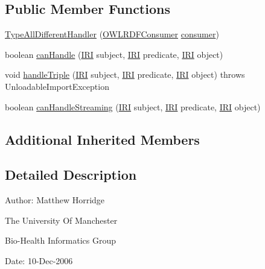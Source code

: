 \subsection*{Public Member Functions}
\begin{DoxyCompactItemize}
\item 
\hyperlink{classorg_1_1coode_1_1owlapi_1_1rdfxml_1_1parser_1_1_type_all_different_handler_aa12a865a3096be12c203fff853d6a3b7}{Type\-All\-Different\-Handler} (\hyperlink{classorg_1_1coode_1_1owlapi_1_1rdfxml_1_1parser_1_1_o_w_l_r_d_f_consumer}{O\-W\-L\-R\-D\-F\-Consumer} \hyperlink{classorg_1_1coode_1_1owlapi_1_1rdfxml_1_1parser_1_1_abstract_triple_handler_a4ccf4d898ff01eb1cadfa04b23d54e9c}{consumer})
\item 
boolean \hyperlink{classorg_1_1coode_1_1owlapi_1_1rdfxml_1_1parser_1_1_type_all_different_handler_a553fddaf13909b537fced98ef8948033}{can\-Handle} (\hyperlink{classorg_1_1semanticweb_1_1owlapi_1_1model_1_1_i_r_i}{I\-R\-I} subject, \hyperlink{classorg_1_1semanticweb_1_1owlapi_1_1model_1_1_i_r_i}{I\-R\-I} predicate, \hyperlink{classorg_1_1semanticweb_1_1owlapi_1_1model_1_1_i_r_i}{I\-R\-I} object)
\item 
void \hyperlink{classorg_1_1coode_1_1owlapi_1_1rdfxml_1_1parser_1_1_type_all_different_handler_afce4e179b45a790d2f9009a8f4208044}{handle\-Triple} (\hyperlink{classorg_1_1semanticweb_1_1owlapi_1_1model_1_1_i_r_i}{I\-R\-I} subject, \hyperlink{classorg_1_1semanticweb_1_1owlapi_1_1model_1_1_i_r_i}{I\-R\-I} predicate, \hyperlink{classorg_1_1semanticweb_1_1owlapi_1_1model_1_1_i_r_i}{I\-R\-I} object)  throws Unloadable\-Import\-Exception 
\item 
boolean \hyperlink{classorg_1_1coode_1_1owlapi_1_1rdfxml_1_1parser_1_1_type_all_different_handler_a0ae404d99b9fb75cfd4570a932a653dc}{can\-Handle\-Streaming} (\hyperlink{classorg_1_1semanticweb_1_1owlapi_1_1model_1_1_i_r_i}{I\-R\-I} subject, \hyperlink{classorg_1_1semanticweb_1_1owlapi_1_1model_1_1_i_r_i}{I\-R\-I} predicate, \hyperlink{classorg_1_1semanticweb_1_1owlapi_1_1model_1_1_i_r_i}{I\-R\-I} object)
\end{DoxyCompactItemize}
\subsection*{Additional Inherited Members}


\subsection{Detailed Description}
Author\-: Matthew Horridge\par
 The University Of Manchester\par
 Bio-\/\-Health Informatics Group\par
 Date\-: 10-\/\-Dec-\/2006\par
\par
 

